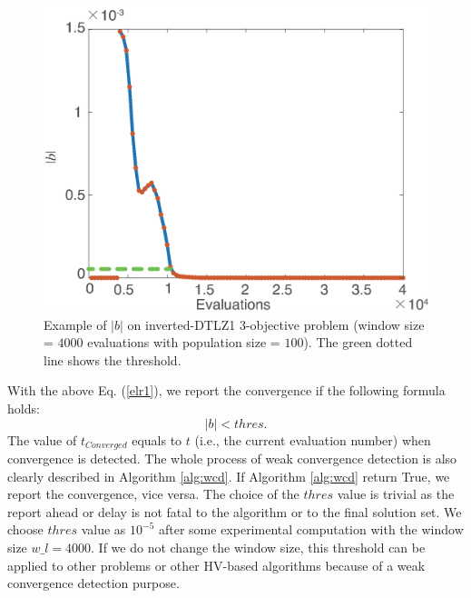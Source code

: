\documentclass[conference]{IEEEtran}
\begin{document}
\begin{figure}[!t]
  \centering
    \includegraphics[width=\columnwidth]{FVEMOA_IDTLZ1_M3_nadir_2}
  \caption{Example of $\lvert b\rvert$ on inverted-DTLZ1 3-objective problem
  (window size = $4000$ evaluations with population size = $100$).
  The green dotted line shows the threshold.
  }
  \label{wcd2}
\end{figure}

With the above Eq. (\ref{elr1}), we report the convergence if the following
formula holds:
\begin{equation}\label{elr2}
  \lvert b \rvert < thres. 
\end{equation}
The value of $t_{Converged}$ equals to $t$ (i.e., the current evaluation number) 
when convergence is detected. 
The whole process of weak convergence detection is also clearly described in Algorithm \ref{alg:wcd}. 
If Algorithm \ref{alg:wcd} return True, we report the convergence, vice versa. 
The choice of the $thres$ value is trivial 
as the report ahead or delay is not fatal to the algorithm or to the final solution set.
We choose $thres$ value as $10^{-5}$ after some experimental computation with 
the window size $w\_ l = 4000$. 
If we do not change the window size, 
this threshold can be applied to other problems or other HV-based algorithms
because of a weak convergence detection purpose.
\end{document}

